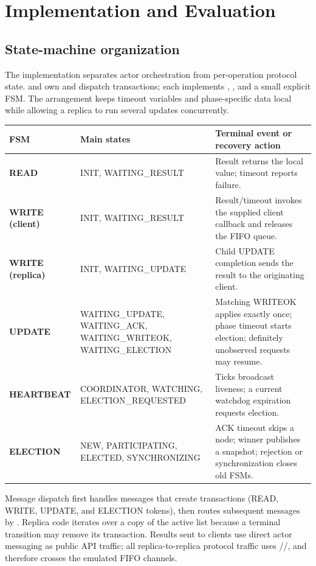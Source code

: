 \clearpage
\section{Implementation and Evaluation}

\subsection{State-machine organization}

The implementation separates actor orchestration from per-operation protocol state.  and  own and dispatch transactions; each  implements , , and a small explicit FSM. The arrangement keeps timeout variables and phase-specific data local while allowing a replica to run several updates concurrently.

\noindent\begin{tabularx}{\textwidth}{@{}>{\bfseries}p{29mm} p{43mm} X@{}}
\toprule
FSM & Main states & Terminal event or recovery action \\
\midrule
READ & INIT, WAITING\_RESULT & Result returns the local value; timeout reports failure. \\
WRITE (client) & INIT, WAITING\_RESULT & Result/timeout invokes the supplied client callback and releases the FIFO queue. \\
WRITE (replica) & INIT, WAITING\_UPDATE & Child UPDATE completion sends the result to the originating client. \\
UPDATE & WAITING\_UPDATE, WAITING\_ACK, WAITING\_WRITEOK, WAITING\_ELECTION & Matching WRITEOK applies exactly once; phase timeout starts election; definitely unobserved requests may resume. \\
HEARTBEAT & COORDINATOR, WATCHING, ELECTION\_REQUESTED & Ticks broadcast liveness; a current watchdog expiration requests election. \\
ELECTION & NEW, PARTICIPATING, ELECTED, SYNCHRONIZING & ACK timeout skips a node; winner publishes a snapshot; rejection or synchronization closes old FSMs. \\
\bottomrule
\end{tabularx}

Message dispatch first handles messages that create transactions (READ, WRITE, UPDATE, and ELECTION tokens), then routes subsequent messages by . Replica code iterates over a copy of the active list because a terminal transition may remove its transaction. Results sent to clients use direct actor messaging as public API traffic; all replica-to-replica protocol traffic uses //, and therefore crosses the emulated FIFO channels.

